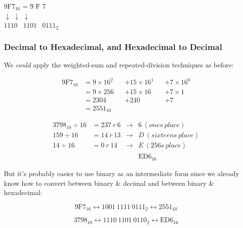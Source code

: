 \documentclass{article}
\begin{document}
\begin{tabbing}
$\mathrm{9F7}_{16}$ = \= 9\phantom{000} \= F\phantom{000} \= 7\phantom{000} \\
\> $\downarrow$ \> $\downarrow$ \> $\downarrow$ \\
\> $1110$\ \> $1101$\ \> $0111_2$
\end{tabbing}

\subsubsection{Decimal to Hexadecimal, and Hexadecimal to Decimal}

We \textit{could} apply the weighted-sum and repeated-division techniques as
before:

\begin{align*}
\mathrm{9F7}_{16} &= 9 \times 16^2 &&+ 15 \times 16^1 &&+ 7 \times 16^0 \\
    &= 9 \times 256 &&+ 15 \times 16 &&+ 7 \times 1 \\
    &= 2304 &&+ 240 &&+ 7\\
    &= 2551_{10}
\end{align*}

\begin{align*}
3798_{10} \div 16   &= 237\ r\ 6 &\rightarrow& 6\ (ones\ place) \\
159 \div 16         &= 14\ r\ 13 &\rightarrow& D\ (sixteens\ place) \\
14 \div 16          &= 0\ r\ 14 &\rightarrow& \underline{E\ (256s\ place)} \\
                    &&& \mathrm{ED6}_{16}
\end{align*}

But it's probably easier to use binary as an intermediate form since we already
know how to convert between binary \& decimal and between binary \& hexadecimal:

\[\mathrm{9F7}_{16} \leftrightarrow 1001\ 1111\ 0111_2 \leftrightarrow 2551_{10}\]

\[3798_{10} \leftrightarrow 1110\ 1101\ 0110_2 \leftrightarrow \mathrm{ED6}_{16}\]
\end{document}
